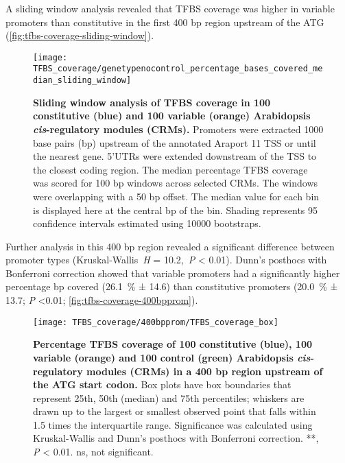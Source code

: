 \documentclass[../main.tex]{subfiles}
\begin{document}
A sliding window analysis revealed that TFBS coverage was higher in variable promoters than constitutive in the first 400 bp region upstream of the ATG (\autoref{fig:tfbs-coverage-sliding-window}).

 \begin{figure}[hbt!]
	\begin{center}
		\capstart
		\texttt{[image: TFBS\_coverage/genetypenocontrol\_percentage\_bases\_covered\_median\_sliding\_window]}
		\caption{
			\textbf{Sliding window analysis of TFBS coverage in 100 constitutive (blue) and 100 variable (orange) Arabidopsis \textit{cis}\hyp{}regulatory modules (CRMs).}
			Promoters were extracted 1000 base pairs (bp) upstream of the annotated Araport 11 \autocite{chengAraport11CompleteReannotation2017} TSS or until the nearest gene.
			5'UTRs were extended downstream of the TSS to the closest coding region.
			The median percentage TFBS coverage was scored for 100 bp windows across selected CRMs.
			The windows were overlapping with a 50 bp offset.
			The median value for each bin is displayed here at the central bp of the bin.
			Shading represents 95 confidence intervals estimated using 10000 bootstraps.
			\label{fig:tfbs-coverage-sliding-window}
		}
	\end{center}
\end{figure}


Further analysis in this 400 bp region revealed a significant difference between promoter types (Kruskal\hyp{}Wallis~\textit{H} = 10.2,~\textit{P} \textless{} 0.01). Dunn's posthocs with Bonferroni correction showed that variable promoters had a significantly higher percentage bp covered (\SI{26.1}{\percent} ± 14.6) than constitutive promoters (\SI{20.0}{\percent} ± 13.7; \textit{P} \textless 0.01; \autoref{fig:tfbs-coverage-400bpprom}).

\begin{figure}[hbt!]
	\begin{center}
		\capstart
		\texttt{[image: TFBS\_coverage/400bpprom/TFBS\_coverage\_box]}
		\caption{
			\textbf{Percentage TFBS coverage of 100 constitutive (blue), 100 variable (orange) and 100 control (green) Arabidopsis \textit{cis}\hyp{}regulatory modules (CRMs) in a 400 bp region upstream of the ATG start codon.}
			Box plots have box boundaries that represent 25th, 50th (median) and 75th percentiles; whiskers are drawn up to the largest or smallest observed point that falls within 1.5 times the interquartile range.
			Significance was calculated using Kruskal\hyp{}Wallis and Dunn's posthocs with Bonferroni correction.
			**, \textit{P} \textless{} 0.01. ns, not significant.
			\label{fig:tfbs-coverage-400bpprom}
		}
	\end{center}
\end{figure}
\end{document}
